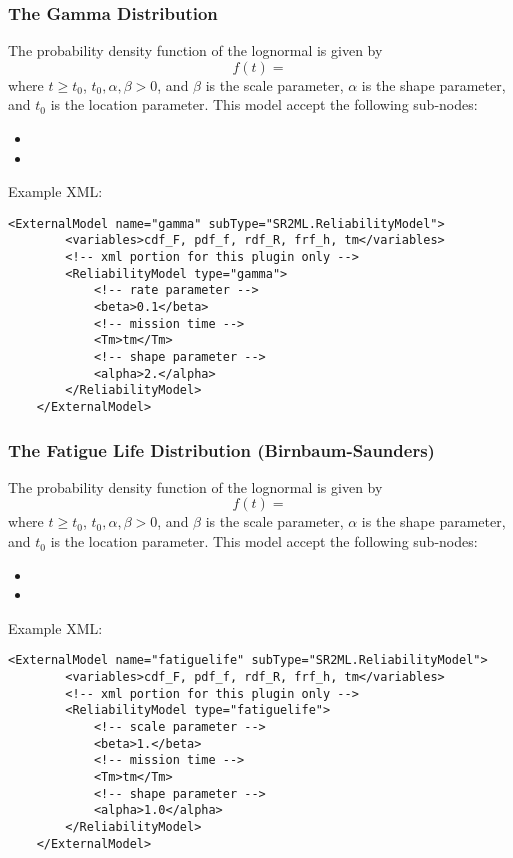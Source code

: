 \subsubsection{The Gamma Distribution}
The probability density function of the lognormal is given by
\begin{equation}
	f(t) =
\end{equation}
where $t\geq t_0$, $t_0, \alpha, \beta >0$, and $\beta$ is the scale parameter, $\alpha$ is the shape
parameter, and $t_0$ is the location parameter.
This model accept the following sub-nodes:
\begin{itemize}
	\item {}
	\item {}
\end{itemize}

Example XML:
\begin{lstlisting}[style=XML]
	<ExternalModel name="gamma" subType="SR2ML.ReliabilityModel">
		<variables>cdf_F, pdf_f, rdf_R, frf_h, tm</variables>
		<!-- xml portion for this plugin only -->
		<ReliabilityModel type="gamma">
			<!-- rate parameter -->
			<beta>0.1</beta>
			<!-- mission time -->
			<Tm>tm</Tm>
			<!-- shape parameter -->
			<alpha>2.</alpha>
		</ReliabilityModel>
	</ExternalModel>
\end{lstlisting}


\subsubsection{The Fatigue Life Distribution (Birnbaum-Saunders)}
The probability density function of the lognormal is given by
\begin{equation}
	f(t) =
\end{equation}
where $t\geq t_0$, $t_0, \alpha, \beta >0$, and $\beta$ is the scale parameter, $\alpha$ is the shape
parameter, and $t_0$ is the location parameter.
This model accept the following sub-nodes:
\begin{itemize}
	\item {}
	\item {}
\end{itemize}

Example XML:
\begin{lstlisting}[style=XML]
	<ExternalModel name="fatiguelife" subType="SR2ML.ReliabilityModel">
		<variables>cdf_F, pdf_f, rdf_R, frf_h, tm</variables>
		<!-- xml portion for this plugin only -->
		<ReliabilityModel type="fatiguelife">
			<!-- scale parameter -->
			<beta>1.</beta>
			<!-- mission time -->
			<Tm>tm</Tm>
			<!-- shape parameter -->
			<alpha>1.0</alpha>
		</ReliabilityModel>
	</ExternalModel>
\end{lstlisting}


